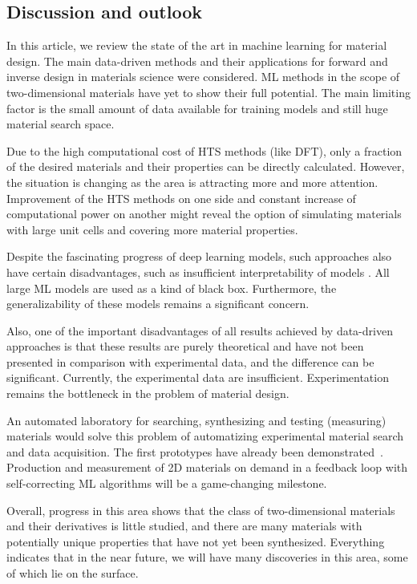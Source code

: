 \subsection{Discussion and outlook}
In this article, we review the state of the art in machine learning for material design. The main data-driven methods and their applications for forward and inverse design in materials science were considered. ML methods in the scope of two-dimensional materials have yet to show their full potential. The main limiting factor is the small amount of data available for training models and still huge material search space.

Due to the high computational cost of HTS methods (like DFT), only a fraction of the desired materials and their properties can be directly calculated. However, the situation is changing as the area is attracting more and more attention. Improvement of the HTS methods on one side and constant increase of computational power on another might reveal the option of simulating materials with large unit cells and covering more material properties.

Despite the fascinating progress of deep learning models, such approaches also have certain disadvantages, such as insufficient interpretability of models \cite{gilpin2018explaining}. All large ML models are used as a kind of black box. Furthermore, the generalizability of these models remains a significant concern.

Also, one of the important disadvantages of all results achieved by data-driven approaches is that these results are purely theoretical and have not been presented in comparison with experimental data, and the difference can be significant. Currently, the experimental data are insufficient. Experimentation remains the bottleneck in the problem of material design.

An automated laboratory for searching, synthesizing and testing (measuring) materials would solve this problem of automatizing experimental material search and data acquisition. The first prototypes have already been demonstrated~\cite{burger2020mobile,coley2019robotic}. Production and measurement of 2D materials on demand in a feedback loop with self-correcting ML algorithms will be a game-changing milestone.

Overall, progress in this area shows that the class of two-dimensional materials and their derivatives is little studied, and there are many materials with potentially unique properties that have not yet been synthesized. Everything indicates that in the near future, we will have many discoveries in this area, some of which lie on the surface.
